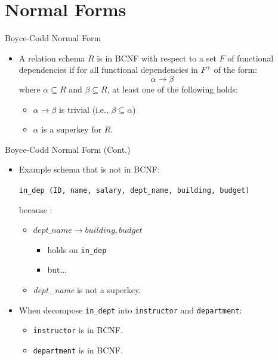 \documentclass{beamer}
\begin{document}
\section{Normal Forms}

\begin{frame}{Boyce-Codd Normal Form}
    \begin{itemize}
        \item A relation schema $R$ is in BCNF with respect to a set $F$ of functional dependencies if for all functional dependencies in $F^+$ of the form:
        $$
            \alpha \rightarrow \beta
        $$
        where $\alpha \subseteq R$ and $\beta \subseteq R$, at least one of the following holds:
        \begin{itemize}
            \item $\alpha \rightarrow \beta$ is trivial (i.e., $\beta \subseteq \alpha$)
            \item $\alpha$ is a superkey for $R$.
        \end{itemize}
    \end{itemize}
\end{frame}

\begin{frame}{Boyce-Codd Normal Form (Cont.)}
    \begin{itemize}
        \item Example schema that is not in BCNF: \\
            \begin{center}
                \texttt{\footnotesize in\_dep (ID, name, salary, dept\_name, building, budget)}
            \end{center}
        because :
        \begin{itemize}
            \item $dept\_name \rightarrow building, budget$
            \begin{itemize}
                \item holds on \texttt{in\_dep}
                \item but...
            \end{itemize}
            \item \textit{dept\_name} is not a superkey.
        \end{itemize}
        \item When decompose \texttt{in\_dept} into \texttt{instructor} and \texttt{department}:
        \begin{itemize}
            \item \texttt{instructor} is in BCNF.
            \item \texttt{department} is in BCNF.
        \end{itemize}
    \end{itemize}
\end{frame}
\end{document}
